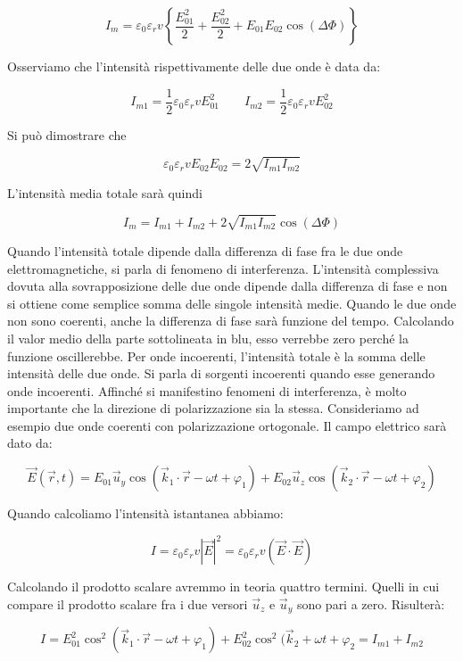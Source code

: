 \[
	I_m = \varepsilon_0 \varepsilon_r v \left\{ \frac{E_{01}^2}{2} + \frac{E_{02}^2}{2} + E_{01}E_{02} \cos (\Delta \Phi) \right\}
\]

Osserviamo che l'intensità rispettivamente delle due onde è data da:

\[
	I_{m1} = \frac{1}{2} \varepsilon_0 \varepsilon_r v E_{01}^2 \qquad I_{m2} = \frac{1}{2} \varepsilon_0 \varepsilon_r v E_{02}^2
\]

Si può dimostrare che

\[
	\varepsilon_0 \varepsilon_r v E_{02}E_{02} = 2 \sqrt{I_{m1}I_{m2}}
\]

L'intensità media totale sarà quindi

\[
	I_m = I_{m1} + I_{m2} + 2 \sqrt{I_{m1}I_{m2}} \cos (\Delta \Phi)
\]

Quando l'intensità totale dipende dalla differenza di fase fra le due onde elettromagnetiche, si parla di fenomeno di interferenza. L'intensità complessiva dovuta alla sovrapposizione delle due onde dipende dalla differenza di fase e non si ottiene come semplice somma delle singole intensità medie.
Quando le due onde non sono coerenti, anche la differenza di fase sarà funzione del tempo. Calcolando il valor medio della parte sottolineata in blu, esso verrebbe zero perché la funzione oscillerebbe. Per onde incoerenti, l'intensità totale è la somma delle intensità delle due onde. Si parla di sorgenti incoerenti quando esse generando onde incoerenti.
Affinché si manifestino fenomeni di interferenza, è molto importante che la direzione di polarizzazione sia la stessa. Consideriamo ad esempio due onde coerenti con polarizzazione ortogonale. Il campo elettrico sarà dato da:

\[
	\vec{E} (\vec{r},t) = E_{01}\vec{u}_y\cos (\vec{k}_1\cdot \vec{r} -\omega t + \varphi_1  ) + E_{02}\vec{u}_z\cos (\vec{k}_2\cdot \vec{r} -\omega t + \varphi_2  )
\]

Quando calcoliamo l'intensità istantanea abbiamo:

\[
	I = \varepsilon_0 \varepsilon_r v |\vec{E}|^2 = \varepsilon_0 \varepsilon_r v(\vec{E} \cdot \vec{E})
\]

Calcolando il prodotto scalare avremmo in teoria quattro termini. Quelli in cui compare il prodotto scalare fra i due versori $ \vec{u}_z $ e $ \vec{u}_y $ sono pari a zero. Risulterà:

\[
	I = E_{01}^2 \cos^2 (\vec{k}_1\cdot \vec{r} -\omega t + \varphi_1) + E_{02}^2 \cos^2 (\vec{k}_2+\omega t + \varphi_2 = I_{m1}+I_{m2}
\]

